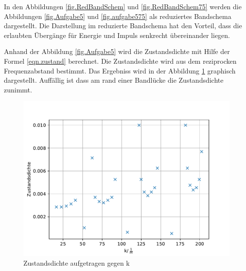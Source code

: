 In den Abbildungen \ref{fig.RedBandSchem} und \ref{fig.RedBandSchem75} werden die Abbildungen \ref{fig.Aufgabe5} und \ref{fig.aufgabe575} als reduziertes Bandschema dargestellt.
Die Darstellung im reduzierte Bandschema hat den Vorteil, dass die erlaubten Übergänge für Energie und Impuls senkrecht übereinander liegen.

Anhand der Abbildung \ref{fig.Aufgabe5} wird die Zustandsdichte mit Hilfe der Formel \ref{eqn.zustand} berechnet.
Die Zustandsdichte wird aus dem reziprocken Frequenzabstand bestimmt.
Das Ergebniss wird in der Abbildung \ref{fig.zustandsdichte} graphisch dargestellt.
Auffällig ist dass am rand einer Bandlücke die Zustandsdichte zunimmt.


\begin{figure}[h!]
  \centering
  \includegraphics[width=\textwidth]{Zustandsdichte.pdf}
  \caption{Zustandsdichte aufgetragen gegen k}
  \label{fig.zustandsdichte}
\end{figure}
\FloatBarrier


%

